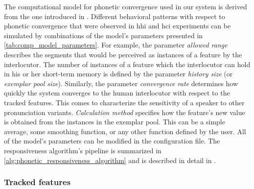 The computational model for phonetic convergence used in our system is derived from the one introduced in \citet{Raveh2017Interspeech}.
Different behavioral patterns with respect to phonetic convergence that were observed in \ac{hhi} and \ac{hci} experiments \citep{CohenPriva2017baseline, Gessinger2017Interspeech, Schweitzer2016exemplar, Babel2010dialect} can be simulated by combinations of the model's parameters presented in \cref{tab:comp_model_parameters}.
For example, the parameter \emph{allowed range} describes the segments that would be perceived as instances of a feature by the interlocutor.
The number of instances of a feature which the interlocutor can hold in his or her short-term memory is defined by the parameter \emph{history size} (or \emph{exemplar pool size}).
Similarly, the parameter \emph{convergence rate} determines how quickly the system converges to the human interlocutor with respect to the tracked features.
This comes to characterize the sensitivity of a speaker to other pronunciation variants.
\emph{Calculation method} specifies how the feature's new value is obtained from the instances in the exemplar pool.
This can be a simple average, some smoothing function, or any other function defined by the user.
All of the model's parameters can be modified in the configuration file.
The responsiveness algorithm's pipeline is summarized in \cref{alg:phonetic_responsiveness_algorithm} and is described in detail in \citet{Raveh2017Interspeech}.

\subsubsection{Tracked features}
\label{subsubsec:tracked_features}

